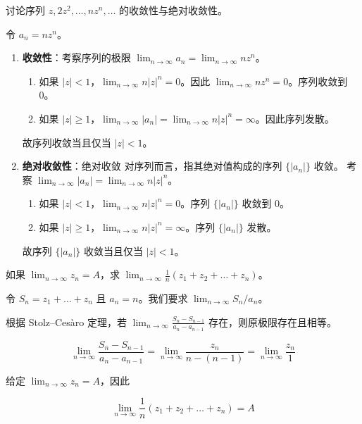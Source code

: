
\begin{question}
讨论序列 \(z, 2z^2, \dots, n z^n, \dots\) 的收敛性与绝对收敛性。

\begin{solution}
令 \(a_n = n z^n\)。

\begin{enumerate}
  \item \textbf{收敛性}：考察序列的极限 \(\displaystyle\lim_{n\to\infty} a_n = \lim_{n\to\infty} n z^n\)。
    \begin{enumerate}
      \item 如果 \(|z| < 1\)，\(\displaystyle\lim_{n\to\infty} n|z|^n = 0\)。因此 \(\displaystyle\lim_{n\to\infty} n z^n = 0\)。序列收敛到 0。
      \item 如果 \(|z| \ge 1\)，\(\displaystyle\lim_{n\to\infty} |a_n| = \lim_{n\to\infty} n|z|^n = \infty\)。因此序列发散。
    \end{enumerate}
    故序列收敛当且仅当 \(|z| < 1\)。

  \item \textbf{绝对收敛性}：绝对收敛 对序列而言，指其绝对值构成的序列 \(\{|a_n|\}\) 收敛。
    考察 \(\displaystyle\lim_{n\to\infty} |a_n| = \lim_{n\to\infty} n|z|^n\)。
    \begin{enumerate}
      \item 如果 \(|z| < 1\)，\(\displaystyle\lim_{n\to\infty} n|z|^n = 0\)。序列 \(\{|a_n|\}\) 收敛到 0。
      \item 如果 \(|z| \ge 1\)，\(\displaystyle\lim_{n\to\infty} n|z|^n = \infty\)。序列 \(\{|a_n|\}\) 发散。
    \end{enumerate}
    故序列 \(\{|a_n|\}\) 收敛当且仅当 \(|z| < 1\)。
\end{enumerate}
\end{solution}
\end{question}

\begin{question}
如果 \(\displaystyle\lim_{n\to\infty} z_n = A\)，求 \(\displaystyle\lim_{n\to\infty} \frac1n (z_1 + z_2 + \dots + z_n)\)。

\begin{solution}
令 \(S_n = z_1 + \dots + z_n\) 且 \(a_n = n\)。我们要求 \(\displaystyle\lim_{n\to\infty} S_n / a_n\)。

根据 Stolz--Ces\`aro 定理，若 \(\displaystyle\lim_{n\to\infty} \frac{S_n - S_{n-1}}{a_n - a_{n-1}}\) 存在，则原极限存在且相等。

\[
\lim_{n\to\infty} \frac{S_n - S_{n-1}}{a_n - a_{n-1}} = \lim_{n\to\infty} \frac{z_n}{n - (n-1)} = \lim_{n\to\infty} \frac{z_n}{1}
\]

给定 \(\displaystyle\lim_{n\to\infty} z_n = A\)，因此

\[
\lim_{n\to\infty} \frac1n (z_1 + z_2 + \dots + z_n) = A
\]
\end{solution}
\end{question}

